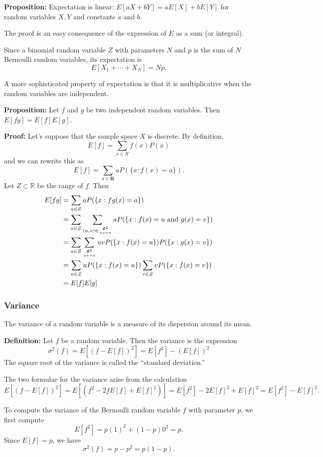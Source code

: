 \documentclass[
  11pt,
  letterpaper,
]{scrbook}
\theoremstyle{plain}
\theoremstyle{plain}
\theoremstyle{remark}
\begin{document}
\textbf{Proposition:} Expectation is linear: \(E[aX+bY]=aE[X]+bE[Y]\)
for random variables \(X,Y\) and constants \(a\) and \(b\).

The proof is an easy consequence of the expression of \(E\) as a sum (or
integral).

Since a binomial random variable \(Z\) with parameters \(N\) and \(p\)
is the sum of \(N\) Bernoulli random variables, its expectation is \[
E[X_1+\cdots+X_N]=Np.
\]

A more sophisticated property of expectation is that it is
multiplicative when the random variables are independent.

\textbf{Proposition:} Let \(f\) and \(g\) be two independent random
variables. Then \(E[fg]=E[f]E[g]\).

\textbf{Proof:} Let's suppose that the sample space \(X\) is discrete.
By definition, \[
E[f]=\sum_{x\in X}f(x)P(x)
\] and we can rewrite this as \[
E[f]=\sum_{a\in\mathbf{R}} aP(\{x: f(x)=a\}).
\] Let \(Z\subset\mathbb{R}\) be the range of \(f\). Then \begin{align*}
E[fg]&=\sum_{a\in Z} aP(\{x: fg(x)=a\}) \\
&=\sum_{a\in Z}\sum_{(u,v)\in\genfrac{}{}{0pt}{}{\mathbf{Z}^{2}}{uv=a}}aP(\{x:f(x)=u\hbox{\ and\ }g(x)=v\}) \\
&=\sum_{a\in Z}\sum_{\genfrac{}{}{0pt}{}{\mathbf{Z}^{2}}{uv=a}}uvP(\{x:f(x)=u\})P(\{x:g(x)=v\}) \\
&=\sum_{u\in Z}uP(\{x:f(x)=u\})\sum_{v\in Z}vP(\{x:f(x)=v\}) \\
&=E[f]E[g]
\end{align*}

\hypertarget{variance-1}{%
\subsubsection{Variance}\label{variance-1}}

The variance of a random variable is a measure of its dispersion around
its mean.

\textbf{Definition:} Let \(f\) be a random variable. Then the variance
is the expression \[
\sigma^2(f) = E[(f-E[f])^2]=E[f^2]-(E[f])^2
\] The square root of the variance is called the ``standard deviation.''

The two formulae for the variance arise from the calculation \[
E[(f-E[f])^2]=E[(f^2-2fE[f]+E[f]^2)]=E[f^2]-2E[f]^2+E[f]^2=E[f^2]-E[f]^2.
\]

To compute the variance of the Bernoulli random variable \(f\) with
parameter \(p\), we first compute \[
E[f^2]=p(1)^2+(1-p)0^2=p.
\] Since \(E[f]=p\), we have \[
\sigma^2(f)=p-p^2=p(1-p).
\]
\end{document}
